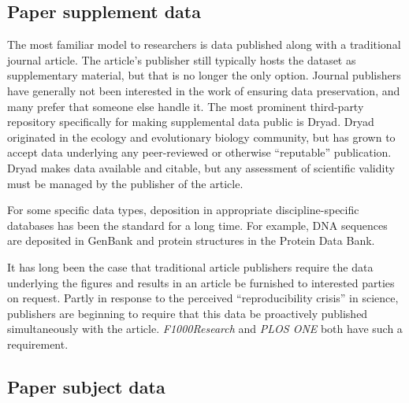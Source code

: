 \documentclass[10pt,a4paper,twocolumn]{article}
\begin{document}
\subsection*{Paper supplement data}\label{paper-supplement-data}

The most familiar model to researchers is data published along with a traditional journal article. 
The article's publisher still typically hosts the dataset as supplementary material, but that is no longer the only option.
Journal publishers have generally not been interested in the work of ensuring data preservation, and many prefer that someone else handle it.
The most prominent third-party repository specifically for making supplemental data public is Dryad\cite{dryad}.
Dryad originated in the ecology and evolutionary biology community, but has grown to accept data underlying any peer-reviewed or otherwise ``reputable'' publication. Dryad makes data available and citable, but any assessment of scientific validity must be managed by the publisher of the article. 

For some specific data types, deposition in appropriate discipline-specific databases has been the standard for a long time. 
For example, DNA sequences are deposited in GenBank\cite{genbank} and protein structures in the Protein Data Bank\cite{protein_data_bank}.

It has long been the case that traditional article publishers require the data underlying the figures and results in an article be furnished to interested parties on request.
Partly in response to the perceived ``reproducibility crisis'' in science, publishers are beginning to require that this data be proactively published simultaneously with the article.  
\emph{F1000Research} and \emph{PLOS ONE} both have such a requirement.





\subsection*{Paper subject data}\label{paper-subject-data}
\end{document}
